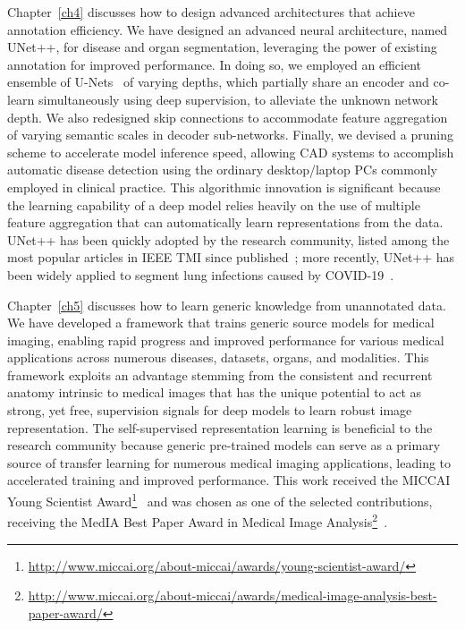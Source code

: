 Chapter~\ref{ch4} discusses how to design advanced architectures that achieve annotation efficiency. We have designed an advanced neural architecture, named UNet++, for disease and organ segmentation, leveraging the power of existing annotation for improved performance. In doing so, we employed an efficient ensemble of U-Nets~\citep{falk2019u} of varying depths, which partially share an encoder and co-learn simultaneously using deep supervision, to alleviate the unknown network depth. 
We also redesigned skip connections to accommodate feature aggregation of varying semantic scales in decoder sub-networks. 
Finally, we devised a pruning scheme to accelerate model inference speed, allowing CAD systems to accomplish automatic disease detection using the ordinary desktop/laptop PCs commonly employed in clinical practice. This algorithmic innovation is significant because the learning capability of a deep model relies heavily on the use of multiple feature aggregation that can automatically learn representations from the data. UNet++ has been quickly adopted by the research community, listed among the most popular articles in IEEE TMI since published~\citep{zhou2018unet++,zhou2019unet++}; more recently, UNet++ has been widely applied to segment lung infections caused by COVID-19~\citep{dong2020role,shi2020review}. 
    
Chapter~\ref{ch5} discusses how to learn generic knowledge from unannotated data. We have developed a framework that trains generic source models for medical imaging, enabling rapid progress and improved performance for various medical applications across numerous diseases, datasets, organs, and modalities. This framework exploits an advantage stemming from the consistent and recurrent anatomy intrinsic to medical images that has the unique potential to act as strong, yet free, supervision signals for deep models to learn robust image representation. The self-supervised representation learning is beneficial to the research community because generic pre-trained models can serve as a primary source of transfer learning for numerous medical imaging applications, leading to accelerated training and improved performance. This work received the MICCAI Young Scientist Award\footnote{\href{http://www.miccai.org/about-miccai/awards/young-scientist-award/}{http://www.miccai.org/about-miccai/awards/young-scientist-award/}}~\citep{zhou2019models} and was chosen as one of the selected contributions, receiving the MedIA Best Paper Award in Medical Image Analysis\footnote{\href{http://www.miccai.org/about-miccai/awards/medical-image-analysis-best-paper-award/}{http://www.miccai.org/about-miccai/awards/medical-image-analysis-best-paper-award/}}~\citep{zhou2021models}.

